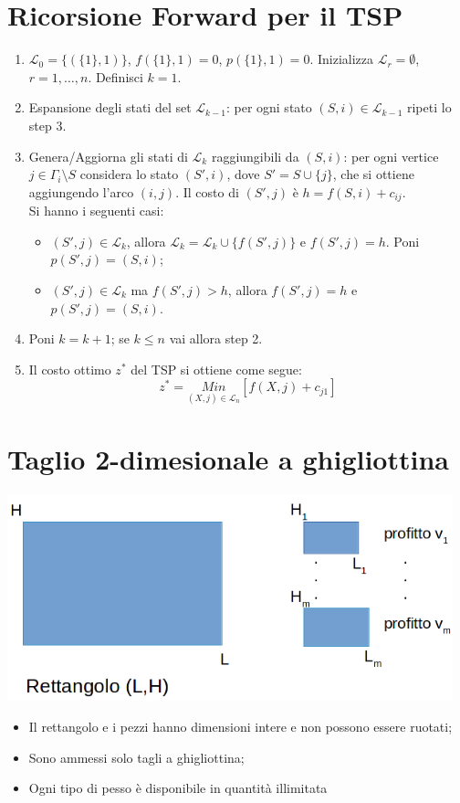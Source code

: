 \section{Ricorsione Forward per il TSP}
\begin{enumerate}
	\item $\mathscr{L}_{0}=\{(\{1\},1)\}$, $f(\{1\},1)=0$, $p(\{1\},1)=0$. Inizializza $\mathscr{L}_{r}=\emptyset$, $r=1,\dots,n$. Definisci $k=1$.
	\item Espansione degli stati del set $\mathscr{L}_{k-1}$: per ogni stato $(S,i)\in\mathscr{L}_{k-1}$ ripeti lo step 3.
	\item Genera/Aggiorna gli stati di $\mathscr{L}_{k}$ raggiungibili da $(S,i)$: per ogni vertice $j\in\Gamma_{i}\setminus S$ considera lo stato $(S',i)$, dove $S'=S\cup\{j\}$, che si ottiene aggiungendo l'arco $(i,j)$. Il costo di $(S',j)$ è $h=f(S,i)+c_{ij}$.\\
	Si hanno i seguenti casi:
	\begin{itemize}
		\item $(S',j)\in\mathscr{L}_{k}$, allora $\mathscr{L}_{k}=\mathscr{L}_{k}\cup \{f(S',j)\}$ e $f(S',j)=h$. Poni $p(S',j)=(S,i)$;
		\item $(S',j)\in\mathscr{L}_{k}$ ma $f(S',j)>h$, allora $f(S',j)=h$ e $p(S',j)=(S,i)$.
	\end{itemize}
	\item Poni $k=k+1$; se $k\le n$ vai allora step 2.
	\item Il costo ottimo $z^{*}$ del TSP si ottiene come segue:
	\begin{equation}
		z^{*}=\underset{(X,j)\in\mathscr{L}_{n}}{Min}[f(X,j)+c_{j1}]
	\end{equation}
\end{enumerate}

\section{Taglio 2-dimesionale a ghigliottina}
\centerline{\includegraphics[height=6cm]{images/shape1.png}}
\begin{itemize}
	\item Il rettangolo e i pezzi hanno dimensioni intere e non possono essere ruotati;
	\item Sono ammessi solo tagli a ghigliottina;
	\item Ogni tipo di pesso è disponibile in quantità illimitata
\end{itemize}

